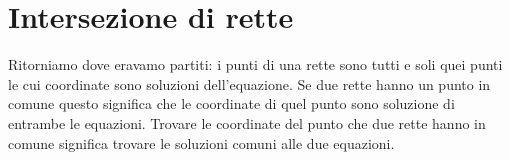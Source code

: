 % 

\section{Intersezione di rette}
\label{sec:retta_intersezionedirette}

Ritorniamo dove eravamo partiti: i punti di una rette sono tutti e soli quei 
punti le cui coordinate sono soluzioni dell'equazione. Se due rette hanno un 
punto in comune questo significa che le coordinate di quel punto sono 
soluzione di entrambe le equazioni. Trovare le coordinate del punto che due 
rette hanno in comune significa trovare le soluzioni comuni alle due equazioni.

